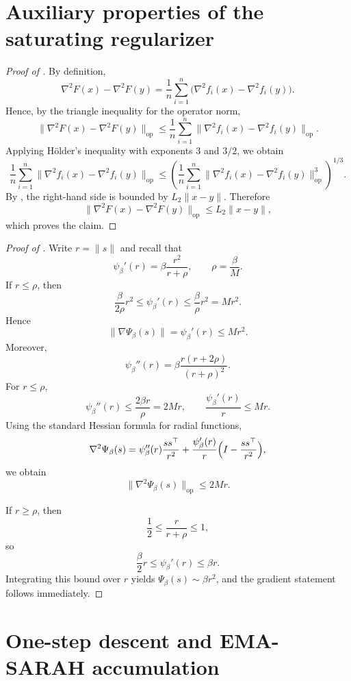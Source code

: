 \documentclass{article}
\theoremstyle{plain}
\theoremstyle{definition}
\theoremstyle{remark}
\begin{document}


\clearpage
\appendix
\onecolumn

\section{Auxiliary properties of the saturating regularizer}\label{app:psi}

\begin{proof}[Proof of ]
By definition,
\[
\nabla^2F(x)-\nabla^2F(y)
=
\frac1n\sum_{i=1}^n\bigl(\nabla^2 f_i(x)-\nabla^2 f_i(y)\bigr).
\]
Hence, by the triangle inequality for the operator norm,
\[
\|\nabla^2F(x)-\nabla^2F(y)\|_{\mathrm{op}}
\le
\frac1n\sum_{i=1}^n
\|\nabla^2 f_i(x)-\nabla^2 f_i(y)\|_{\mathrm{op}}.
\]
Applying Hölder's inequality with exponents \(3\) and \(3/2\), we obtain
\[
\frac1n\sum_{i=1}^n
\|\nabla^2 f_i(x)-\nabla^2 f_i(y)\|_{\mathrm{op}}
\le
\left(
\frac1n\sum_{i=1}^n
\|\nabla^2 f_i(x)-\nabla^2 f_i(y)\|_{\mathrm{op}}^3
\right)^{1/3}.
\]
By , the right-hand side is bounded by \(L_2\|x-y\|\). Therefore
\[
\|\nabla^2F(x)-\nabla^2F(y)\|_{\mathrm{op}}
\le
L_2\|x-y\|,
\]
which proves the claim.
\end{proof}

\begin{proof}[Proof of ]
Write \(r=\|s\|\) and recall that
\[
\psi_\beta'(r)=\beta\frac{r^2}{r+\rho},\qquad \rho=\frac{\beta}{M}.
\]
If \(r\le \rho\), then
\[
\frac{\beta}{2\rho}r^2\le \psi_\beta'(r)\le \frac{\beta}{\rho}r^2 = Mr^2.
\]
Hence
\[
\|\nabla \Psi_\beta(s)\|=\psi_\beta'(r)\le Mr^2.
\]
Moreover,
\[
\psi_\beta''(r)=\beta \frac{r(r+2\rho)}{(r+\rho)^2}.
\]
For \(r\le \rho\),
\[
\psi_\beta''(r)\le \frac{2\beta r}{\rho}=2Mr,
\qquad
\frac{\psi_\beta'(r)}{r}\le Mr.
\]
Using the standard Hessian formula for radial functions,
\[
\nabla^2\Psi_\beta(s)
=
\psi_\beta''(r)\frac{ss^\top}{r^2}
+
\frac{\psi_\beta'(r)}{r}\Bigl(I-\frac{ss^\top}{r^2}\Bigr),
\]
we obtain
\[
\|\nabla^2\Psi_\beta(s)\|_{\mathrm{op}}\le 2Mr.
\]

If \(r\ge \rho\), then
\[
\frac12\le \frac{r}{r+\rho}\le 1,
\]
so
\[
\frac{\beta}{2}r\le \psi_\beta'(r)\le \beta r.
\]
Integrating this bound over \(r\) yields \(\Psi_\beta(s)\sim \beta r^2\), and the gradient statement follows immediately.
\end{proof}

\section{One-step descent and EMA-SARAH accumulation}\label{app:ema}
\end{document}
